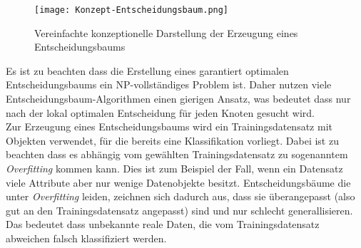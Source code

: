 \begin{figure}[htbp]
    \centering
    \texttt{[image: Konzept-Entscheidungsbaum.png]}
    \caption{Vereinfachte konzeptionelle Darstellung der Erzeugung eines Entscheidungsbaums \autocite{SebastianManteyPruning:online}}
\end{figure}

Es ist zu beachten dass die Erstellung eines garantiert optimalen Entscheidungsbaums ein NP-vollständiges Problem ist. Daher nutzen viele Entscheidungsbaum-Algorithmen einen gierigen Ansatz, was bedeutet dass nur nach der lokal optimalen Entscheidung für jeden Knoten gesucht wird. \autocite{Decision46:online}\\

Zur Erzeugung eines Entscheidungsbaums wird ein Trainingsdatensatz mit Objekten verwendet, für die bereits eine Klassifikation vorliegt. \autocite{Entschei47:online} Dabei ist zu beachten dass es abhängig vom gewählten Trainingsdatensatz zu sogenanntem \textit{Overfitting} kommen kann. Dies ist zum Beispiel der Fall, wenn ein Datensatz viele Attribute aber nur wenige Datenobjekte besitzt. \autocite{PythonCourseDecisionTrees:online} Entscheidungsbäume die unter \textit{Overfitting} leiden, zeichnen sich dadurch aus, dass sie überangepasst (also gut an den Trainingsdatensatz angepasst) sind und nur schlecht generallisieren. Das bedeutet dass unbekannte reale Daten, die vom Trainingsdatensatz abweichen falsch klassifiziert werden. \autocite{DataMining}